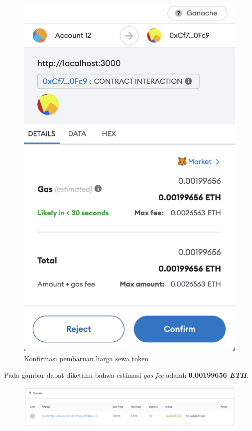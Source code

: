 \begin{itemize}
\begin{figure} [H]
        \includegraphics[scale=0.3]{gambar/img-test-rent-put-item-for-rent-2-1.png}
        \caption{Konfirmasi pembaruan harga sewa token}
        \label{fig:TestRentKonfirmasiPembaruanPenyewa2-1}
      \end{figure}
      Pada gambar dapat diketahu bahwa estimasi \emph{gas fee} adalah \textbf{0,00199656 \emph{ETH}}.
      \begin{figure} [H] \centering
        \includegraphics[scale=0.3]{gambar/img-test-rent-put-item-for-rent-2-2.png}

\end{figure}
\end{itemize}
